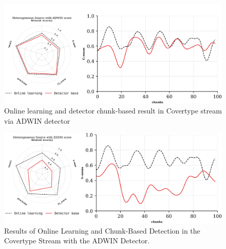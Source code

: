 \begin{figure}[!ht]
	\centering
	\includegraphics[width=1\linewidth]{6_transfer_learning/figures/exp4.png}
	\caption{Online learning and detector chunk-based result in Covertype stream via ADWIN detector}
	\label{fig:6_exp6}
\end{figure}

\begin{figure}[!ht]
	\centering
	\includegraphics[width=1\linewidth]{6_transfer_learning/figures/exp5.png}
  \caption{Results of Online Learning and Chunk-Based Detection in the Covertype Stream with the ADWIN Detector.}


	\label{fig:6_exp7}
\end{figure}


